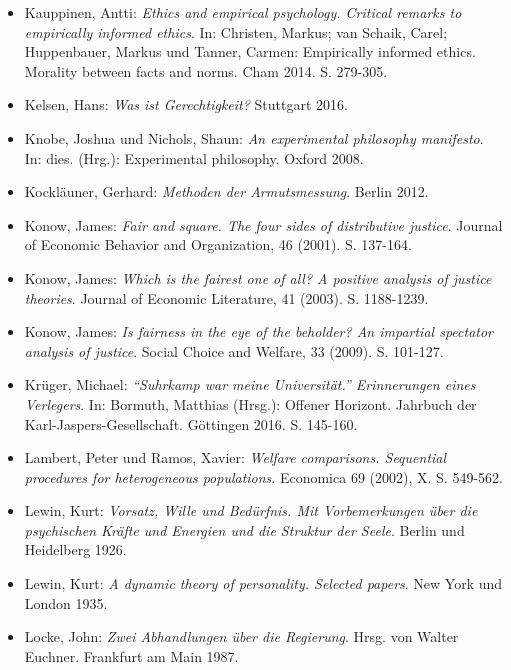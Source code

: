 \documentclass[a4paper]{thesis}
\begin{document}
\begin{itemize}[leftmargin=1.5em,label={},itemindent=-1.5em, itemsep=-1ex]
\item Kauppinen, Antti: \textit{Ethics and empirical psychology. Critical remarks to empirically informed ethics}. In: Christen, Markus; van Schaik, Carel; Huppenbauer, Markus und Tanner, Carmen: Empirically informed ethics. Morality between facts and norms. Cham 2014. S. 279-305.

\item Kelsen, Hans: \textit{Was ist Gerechtigkeit?} Stuttgart 2016.

\item Knobe, Joshua und Nichols, Shaun: \textit{An experimental philosophy manifesto}. In: dies. (Hrg.): Experimental philosophy. Oxford 2008.

\item Kockläuner, Gerhard: \textit{Methoden der Armutsmessung}. Berlin 2012.

\item Konow, James: \textit{Fair and square. The four sides of distributive justice}. Journal of Economic Behavior and Organization, 46 (2001). S. 137-164.

\item Konow, James: \textit{Which is the fairest one of all? A positive analysis of justice theories}. Journal of Economic Literature, 41 (2003). S. 1188-1239.

\item Konow, James: \textit{Is fairness in the eye of the beholder? An impartial spectator analysis of justice}. Social Choice and Welfare, 33 (2009). S. 101-127.

\item Krüger, Michael: \textit{\enquote{Suhrkamp war meine Universität.} Erinnerungen eines Verlegers}. In: Bormuth, Matthias (Hrsg.): Offener Horizont. Jahrbuch der Karl-Jaspers-Gesellschaft. Göttingen 2016. S. 145-160.

\item Lambert, Peter und Ramos, Xavier: \textit{Welfare comparisons. Sequential procedures for heterogeneous populations}. Economica 69 (2002), X. S. 549-562.

\item Lewin, Kurt: \textit{Vorsatz, Wille und Bedürfnis. Mit Vorbemerkungen über die psychischen Kräfte und Energien und die Struktur der Seele}. Berlin und Heidelberg 1926.

\item Lewin, Kurt: \textit{A dynamic theory of personality. Selected papers}. New York und London 1935.

\item Locke, John: \textit{Zwei Abhandlungen über die Regierung}. Hrsg. von Walter Euchner. Frankfurt am Main 1987.


\end{itemize}
\end{document}
